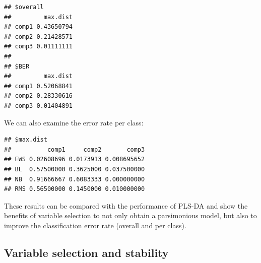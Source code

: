 \documentclass[]{book}
\newenvironment{Shaded}{\begin{snugshade}}{\end{snugshade}}
\newcommand{\KeywordTok}[1]{\textcolor[rgb]{0.13,0.29,0.53}{\textbf{#1}}}
\newcommand{\DataTypeTok}[1]{\textcolor[rgb]{0.13,0.29,0.53}{#1}}
\newcommand{\DecValTok}[1]{\textcolor[rgb]{0.00,0.00,0.81}{#1}}
\newcommand{\StringTok}[1]{\textcolor[rgb]{0.31,0.60,0.02}{#1}}
\newcommand{\CommentTok}[1]{\textcolor[rgb]{0.56,0.35,0.01}{\textit{#1}}}
\newcommand{\OtherTok}[1]{\textcolor[rgb]{0.56,0.35,0.01}{#1}}
\newcommand{\OperatorTok}[1]{\textcolor[rgb]{0.81,0.36,0.00}{\textbf{#1}}}
\newcommand{\NormalTok}[1]{#1}
\begin{document}
\begin{Shaded}
\end{Shaded}

\begin{verbatim}
## $overall
##         max.dist
## comp1 0.43650794
## comp2 0.21428571
## comp3 0.01111111
## 
## $BER
##         max.dist
## comp1 0.52068841
## comp2 0.28330616
## comp3 0.01404891
\end{verbatim}

We can also examine the error rate per class:

\begin{Shaded}
\end{Shaded}

\begin{verbatim}
## $max.dist
##          comp1     comp2       comp3
## EWS 0.02608696 0.0173913 0.008695652
## BL  0.57500000 0.3625000 0.037500000
## NB  0.91666667 0.6083333 0.000000000
## RMS 0.56500000 0.1450000 0.010000000
\end{verbatim}

These results can be compared with the performance of PLS-DA and show
the benefits of variable selection to not only obtain a parsimonious
model, but also to improve the classification error rate (overall and
per class).

\subsection{Variable selection and stability}\label{plsda:stab}
\end{document}
